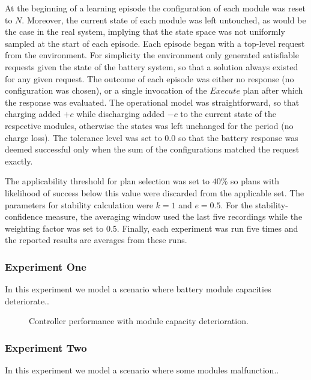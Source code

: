 At the beginning of a learning episode the configuration of each module was reset to $N$. Moreover, the current state of each module was left untouched, as would be the case in the real system, implying that the state space was not uniformly sampled at the start of each episode. Each episode began with a top-level request from the environment. For simplicity the environment only generated satisfiable requests given the state of the battery system, so that a solution always existed for any given request. The outcome of each episode was either no response (no configuration was chosen), or a single invocation of the $Execute$ plan after which the response was evaluated. The operational model was straightforward, so that charging added $+c$ while discharging added $-c$ to the current state of the respective modules, otherwise the states was left unchanged for the period (no charge loss). The tolerance level was set to $0.0$ so that the battery response was deemed successful only when the sum of the configurations matched the request exactly.

The applicability threshold for plan selection was set to $40\%$ so plans with likelihood of success below this value were discarded from the applicable set. The parameters for stability calculation were $k=1$ and $e=0.5$. For the stability-confidence measure, the averaging window used the last five recordings while the weighting factor was set to $0.5$. Finally, each experiment was run five times and the reported results are averages from these runs.

\subsubsection{Experiment One}

In this experiment we model a scenario where battery module capacities deteriorate..

\begin{figure}[ht]
\begin{center}

\end{center}
\caption{Controller performance with module capacity deterioration.}
\label{fig:experiment1}
\end{figure}

\subsubsection{Experiment Two}

In this experiment we model a scenario where some modules malfunction..


